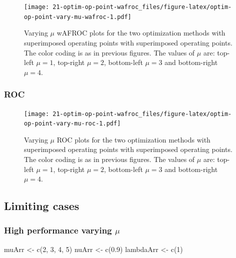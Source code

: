 \documentclass[
]{book}
\newenvironment{Shaded}{\begin{snugshade}}{\end{snugshade}}
\newcommand{\DecValTok}[1]{\textcolor[rgb]{0.00,0.00,0.81}{#1}}
\newcommand{\FloatTok}[1]{\textcolor[rgb]{0.00,0.00,0.81}{#1}}
\newcommand{\FunctionTok}[1]{\textcolor[rgb]{0.00,0.00,0.00}{#1}}
\newcommand{\NormalTok}[1]{#1}
\newcommand{\OtherTok}[1]{\textcolor[rgb]{0.56,0.35,0.01}{#1}}
\begin{document}
\begin{figure}
\centering
\texttt{[image: 21-optim-op-point-wafroc\_files/figure-latex/optim-op-point-vary-mu-wafroc-1.pdf]}
\caption{\label{fig:optim-op-point-vary-mu-wafroc}Varying \(\mu\) wAFROC plots for the two optimization methods with superimposed operating points with superimposed operating points. The color coding is as in previous figures. The values of \(\mu\) are: top-left \(\mu = 1\), top-right \(\mu = 2\), bottom-left \(\mu = 3\) and bottom-right \(\mu = 4\).}
\end{figure}

\hypertarget{roc-4}{%
\subsubsection{ROC}\label{roc-4}}

\begin{figure}
\centering
\texttt{[image: 21-optim-op-point-wafroc\_files/figure-latex/optim-op-point-vary-mu-roc-1.pdf]}
\caption{\label{fig:optim-op-point-vary-mu-roc}Varying \(\mu\) ROC plots for the two optimization methods with superimposed operating points with superimposed operating points. The color coding is as in previous figures. The values of \(\mu\) are: top-left \(\mu = 1\), top-right \(\mu = 2\), bottom-left \(\mu = 3\) and bottom-right \(\mu = 4\).}
\end{figure}

\hypertarget{optim-op-point-limiting-situations}{%
\subsection{Limiting cases}\label{optim-op-point-limiting-situations}}

\hypertarget{optim-op-point-high-performance-vary-mu}{%
\subsubsection{\texorpdfstring{High performance varying \(\mu\)}{High performance varying \textbackslash mu}}\label{optim-op-point-high-performance-vary-mu}}

\begin{Shaded}
\begin{Highlighting}[]
\NormalTok{muArr }\OtherTok{\textless{}{-}} \FunctionTok{c}\NormalTok{(}\DecValTok{2}\NormalTok{, }\DecValTok{3}\NormalTok{, }\DecValTok{4}\NormalTok{, }\DecValTok{5}\NormalTok{)}
\NormalTok{nuArr }\OtherTok{\textless{}{-}} \FunctionTok{c}\NormalTok{(}\FloatTok{0.9}\NormalTok{)}
\NormalTok{lambdaArr }\OtherTok{\textless{}{-}} \FunctionTok{c}\NormalTok{(}\DecValTok{1}\NormalTok{)}
\end{Highlighting}
\end{Shaded}
\end{document}

